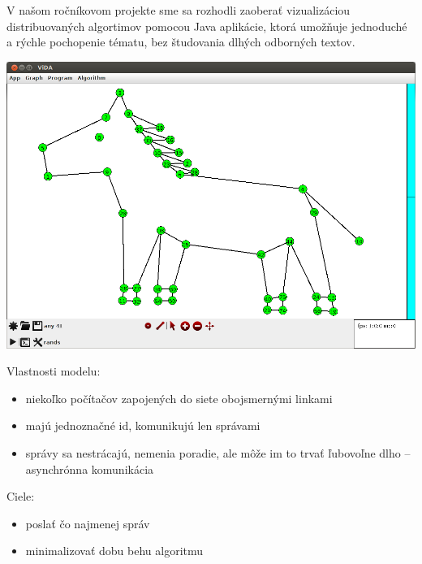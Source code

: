
V našom ročníkovom projekte sme sa rozhodli zaoberať vizualizáciou distribuovaných algortimov
pomocou Java aplikácie, ktorá umožňuje jednoduché a rýchle pochopenie tématu, bez
študovania dlhých odborných textov.

\includegraphics[width=\columnwidth]{konik}


Vlastnosti modelu:
\begin{itemize}
    \item niekoľko počítačov zapojených do siete obojsmernými linkami
    \item majú jednoznačné id, komunikujú len správami
    \item správy sa nestrácajú, nemenia poradie, ale môže im to trvať ľubovoľne dlho -- asynchrónna
    komunikácia
\end{itemize}

Ciele:
\begin{itemize}
    \item poslať čo najmenej správ
    \item minimalizovať dobu behu algoritmu
\end{itemize}

